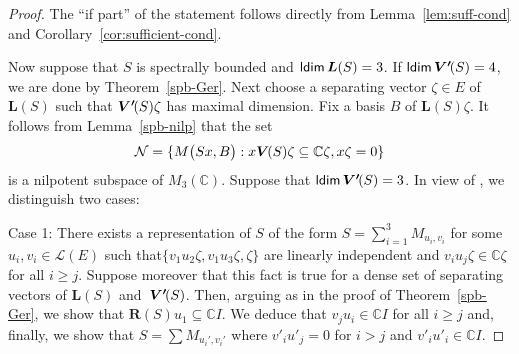 \documentclass[a4paper,12pt,reqno]{amsart}
\numberwithin{equation}{section}
\theoremstyle{definition}
\begin{document}
\begin{proof}
The ``if part'' of the statement follows directly from  Lemma~\ref{lem:suff-cond} and Corollary~\ref{cor:sufficient-cond}.

Now suppose that $S$ is spectrally bounded and ${{\sf ldim}\,}{{\bm L(S)}}=3$. If ${{\sf ldim}\,}{{\bm{V'}\mkern-2.5mu(S)}}=4$, we are done by Theorem~\ref{spb-Ger}.
Next choose  a separating vector $\zeta \in E $   of  ${{\bm L(S)}}$ such that ${{\bm{V'}\mkern-2.5mu(S)}} \zeta$ has maximal dimension. Fix a basis $B$ of ${{\bm L(S)}}\zeta$.
It follows from Lemma~\ref{spb-nilp} that the set
\begin{equation*}
\mathcal N= \{ M\bigl(Sx, B\bigr): x {{\bm V\mkern-2.5mu(S)}}\zeta \subseteq {\mathbb{C}} \zeta, x \zeta=0\}
\end{equation*}
is a nilpotent subspace of $M_3({\mathbb{C}})$. Suppose that ${{\sf ldim}\,}{{\bm{V'}\mkern-2.5mu(S)}}=3$. In view of \cite[Proposition 3]{Fas}, we distinguish two cases:

\smallskip\noindent
Case 1:
There exists a representation of ${S}$ of the form  ${S}= \sum_{i=1}^3 M_{u_i,v_i}$
for some $u_i, v_i \in {{\mathscr L}(E)}$  such that$\{v_1u_2 \zeta, v_1 u_3 \zeta, \zeta\}$ are linearly independent
and $v_i u_j\zeta\in{\mathbb{C}}\zeta$ for all $i\geq j$. Suppose moreover that this fact is true for a dense set of separating vectors of ${{\bm L(S)}}$ and~${{\bm{V'}\mkern-2.5mu(S)}}$.
Then, arguing as in the proof of Theorem~\ref{spb-Ger}, we show that ${{\bm R(S)}} u_1 \subseteq {\mathbb{C}} I$.
We deduce that $v_j u_i\in{\mathbb{C}} I$  for all $i \geq j$ and, finally, we show that ${S}= \sum M_{u_i',v_i'}$
where $v'_i u'_j =0$ for $i >j$ and $v'_i u'_i \in {\mathbb{C}} I$.


\end{proof}
\end{document}
